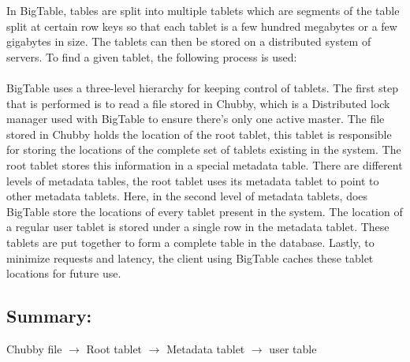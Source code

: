 \documentclass{article}
\begin{document}
In BigTable, tables are split into multiple tablets which are segments of the table split at certain row keys so that each tablet is a few hundred megabytes or a few gigabytes in size. The tablets can then be stored on a distributed system of servers. To find a given tablet, the following process is used: \\\\
BigTable uses a three-level hierarchy for keeping control of tablets. The first step that is performed is to read a file stored in Chubby, which is a Distributed lock manager used with BigTable to ensure there’s only one active master. The file stored in Chubby holds the location of the root tablet, this tablet is responsible for storing the locations of the complete set of tablets existing in the system. The root tablet stores this information in a special metadata table. There are different levels of metadata tables, the root tablet uses its metadata tablet to point to other metadata tablets. Here, in the second level of metadata tablets, does BigTable store the locations of every tablet present in the system. The location of a regular user tablet is stored under a single row in the metadata tablet. These tablets are put together to form a complete table in the database. Lastly, to minimize requests and latency, the client using BigTable caches these tablet locations for future use. 

\subsection*{\textbf{Summary:}}

Chubby file $\rightarrow$ Root tablet $\rightarrow$ Metadata tablet $\rightarrow$ user table 
\end{document}
